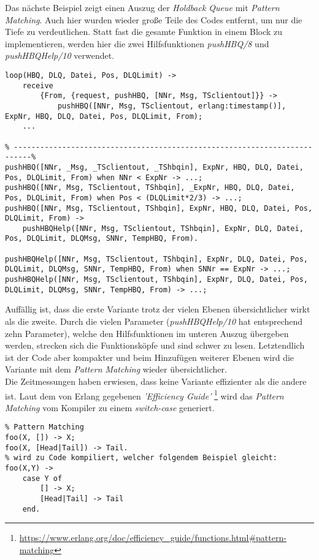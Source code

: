 Das nächste Beispiel zeigt einen Auszug der \textit{Holdback Queue} mit \textit{Pattern Matching}. Auch hier wurden wieder große Teile des Codes entfernt, um nur die Tiefe zu verdeutlichen. Statt fast die gesamte Funktion in einem Block zu implementieren, werden hier die zwei Hilfsfunktionen \textit{pushHBQ/8} und \textit{pushHBQHelp/10} verwendet. 
\newpage
\begin{lstlisting}
loop(HBQ, DLQ, Datei, Pos, DLQLimit) ->
	receive
		{From, {request, pushHBQ, [NNr, Msg, TSclientout]}} ->
			pushHBQ([NNr, Msg, TSclientout, erlang:timestamp()], ExpNr, HBQ, DLQ, Datei, Pos, DLQLimit, From);
    ...
    
% --------------------------------------------------------------------------%
pushHBQ([NNr, _Msg, _TSclientout, _TShbqin], ExpNr, HBQ, DLQ, Datei, Pos, DLQLimit, From) when NNr < ExpNr -> ...;
pushHBQ([NNr, Msg, TSclientout, TShbqin], _ExpNr, HBQ, DLQ, Datei, Pos, DLQLimit, From) when Pos < (DLQLimit*2/3) -> ...;
pushHBQ([NNr, Msg, TSclientout, TShbqin], ExpNr, HBQ, DLQ, Datei, Pos, DLQLimit, From) ->
	pushHBQHelp([NNr, Msg, TSclientout, TShbqin], ExpNr, DLQ, Datei, Pos, DLQLimit, DLQMsg, SNNr, TempHBQ, From).

pushHBQHelp([NNr, Msg, TSclientout, TShbqin], ExpNr, DLQ, Datei, Pos, DLQLimit, DLQMsg, SNNr, TempHBQ, From) when SNNr == ExpNr -> ...;
pushHBQHelp([NNr, Msg, TSclientout, TShbqin], ExpNr, DLQ, Datei, Pos, DLQLimit, DLQMsg, SNNr, TempHBQ, From) -> ...;
\end{lstlisting}

Auffällig ist, dass die erste Variante trotz der vielen Ebenen übersichtlicher wirkt als die zweite. Durch die vielen Parameter (\textit{pushHBQHelp/10} hat entsprechend zehn Parameter), welche den Hilfsfunktionen im unteren Auszug übergeben werden, strecken sich die Funktionsköpfe und sind schwer zu lesen. Letztendlich ist der Code aber kompakter und beim Hinzufügen weiterer Ebenen wird die Variante mit dem \textit{Pattern Matching} wieder übersichtlicher.\\
Die Zeitmessungen haben erwiesen, dass keine Variante effizienter als die andere ist. 
Laut dem von Erlang gegebenen \textit{'Efficiency Guide'} \footnote{\url{https://www.erlang.org/doc/efficiency_guide/functions.html#pattern-matching}} wird das \textit{Pattern Matching} vom Kompiler zu einem \textit{switch-case} generiert. 

\begin{lstlisting}
% Pattern Matching
foo(X, []) -> X;
foo(X, [Head|Tail]) -> Tail.
% wird zu Code kompiliert, welcher folgendem Beispiel gleicht:
foo(X,Y) ->
    case Y of
        [] -> X;
        [Head|Tail] -> Tail
    end.
\end{lstlisting}

